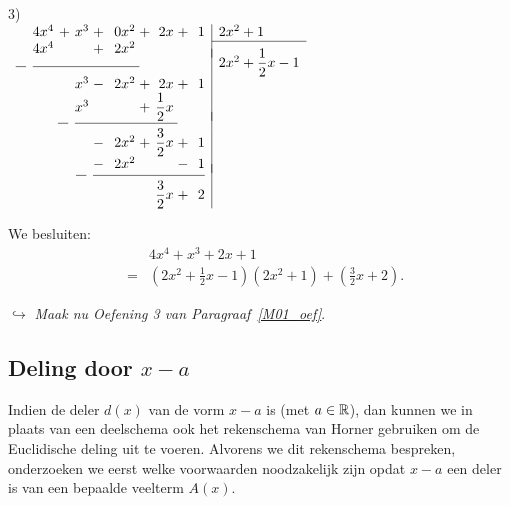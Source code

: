 \documentclass{ximera}
\begin{document}
\vspace{1.2cm}

\noindent
\begin{minipage}{.5\textwidth}
3)\\
$\ds{
\begin{array}{r@{\;}r@{\;}c@{\;}r@{\;}c@{\;}r@{\;}c@{\;}r@{\;}c@{\;}r|l}
&4x^4&+&x^3&+&0x^2&+&2x&+&1&2x^2+1\\\cline{11-11}
&4x^4&&&+&2x^2&&&&&\\[-1.5ex]
\rule{.26cm}{0.4pt}\hspace{2pt}&\multicolumn{5}{@{}l@{}}{\rule{2.68cm}{0.4pt}}&&&&&2x^2+\ds{\frac{1}{2}}x-1\\
&&&x^3&-&2x^2&+&2x&+&1&\\
&&&x^3&&&+&\ds{\frac{1}{2}}x&&&\\[-1.5ex]
&&\rule{.26cm}{0.4pt}\hspace{2pt}&\multicolumn{5}{@{}l@{}}{\rule{2.58cm}{0.4pt}}&&&\\
&&&&-&2x^2&+&\ds{\frac{3}{2}}x&+&1&\\
&&&&-&2x^2&&&-&1&\\[-1.5ex]
&&&\rule{.26cm}{0.4pt}\hspace{2pt}&\multicolumn{6}{@{}l|}{\rule{2.81cm}{0.4pt}}&\\
&&&&&&&\ds{\frac{3}{2}}x&+&2&
\end{array}
}$
\end{minipage}
\hspace{.5cm}
\begin{minipage}{.5\textwidth}
We besluiten:
\begin{eqnarray*}
&&4x^4+x^3+2x+1\\[2ex]
&=&\left(2x^2+\frac{1}{2}x-1\right)(2x^2+1)+\left(\frac{3}{2}x+2\right).
\end{eqnarray*}
\end{minipage}

\vspace{1.5ex}

$\hookrightarrow$ \textit{Maak nu Oefening 3 van Paragraaf~\ref{M01_oef}}.

\subsection{\texorpdfstring{Deling door $x-a$} {Deling door x-a}}

Indien de deler $d(x)$ van de vorm $x-a$ is (met $a\in\mathbb{R}$), dan kunnen we in
plaats van een deelschema ook het rekenschema van Horner
gebruiken om de Euclidische deling uit te voeren. Alvorens we dit rekenschema
bespreken, onderzoeken we eerst welke voorwaarden noodzakelijk
zijn opdat $x-a$ een deler is van een bepaalde veelterm $A(x)$.
\end{document}
